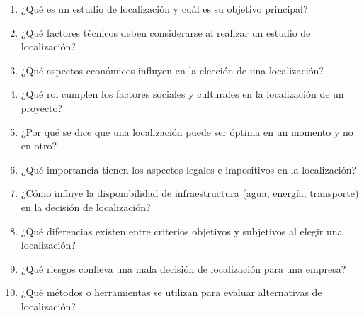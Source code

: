 \documentclass[../main]{subfiles}
\begin{document}
\begin{enumerate}
  \item ¿Qué es un estudio de localización y cuál es su objetivo principal?
  \item ¿Qué factores técnicos deben considerarse al realizar un
    estudio de localización?
  \item ¿Qué aspectos económicos influyen en la elección de una localización?
  \item ¿Qué rol cumplen los factores sociales y culturales en la
    localización de un proyecto?
  \item ¿Por qué se dice que una localización puede ser óptima en un
    momento y no en otro?
  \item ¿Qué importancia tienen los aspectos legales e impositivos en la
    localización?
  \item ¿Cómo influye la disponibilidad de infraestructura (agua,
    energía, transporte) en la decisión de localización?
  \item ¿Qué diferencias existen entre criterios objetivos y
    subjetivos al elegir una localización?
  \item ¿Qué riesgos conlleva una mala decisión de localización para
    una empresa?
  \item ¿Qué métodos o herramientas se utilizan para evaluar
    alternativas de localización?
\end{enumerate}
\end{document}
